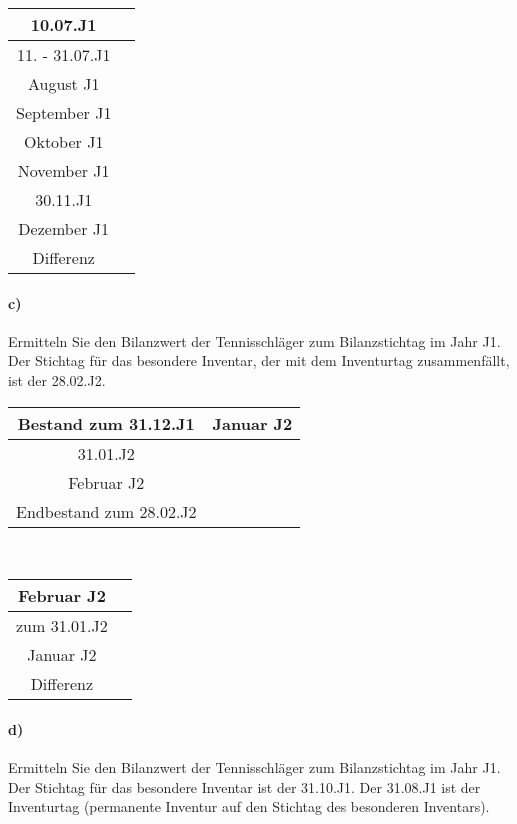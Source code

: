 \documentclass[paper=a4, fontsize=11pt]{scrartcl}
\numberwithin{equation}{section}
\numberwithin{figure}{section}
\numberwithin{table}{section}
\begin{document}
\begin{tabular}{c|c}
\hline
10.07.J1 & \\
\hline
11. - 31.07.J1 & \\
\hline
August J1 & \\
\hline
September J1 & \\
\hline
Oktober J1 & \\
\hline
November J1 & \\
\hline
30.11.J1 & \\
\hline
Dezember J1 & \\
\hline
Differenz & \\
\hline
\end{tabular}

\paragraph{c)}

Ermitteln Sie den Bilanzwert der Tennisschläger zum Bilanzstichtag im Jahr J1. Der Stichtag für das besondere Inventar, der mit dem Inventurtag zusammenfällt, ist der 28.02.J2. \\

\begin{tabular}{c|c}
\hline
Bestand zum 31.12.J1 & 
\hline
Januar J2 & \\
\hline
31.01.J2 & \\
\hline
Februar J2 & \\
\hline
Endbestand zum 28.02.J2 & \\
\hline
\end{tabular}
\\

\begin{tabular}{c|c}
\hline
Februar J2 & \\
\hline
zum 31.01.J2 & \\
\hline
Januar J2 & \\
\hline 
Differenz & \\
\hline
\end{tabular}

\paragraph{d)}

Ermitteln Sie den Bilanzwert der Tennisschläger zum Bilanzstichtag im Jahr J1. Der Stichtag für das besondere Inventar ist der 31.10.J1. Der 31.08.J1 ist der Inventurtag (permanente Inventur auf den Stichtag des besonderen Inventars).  \\
\end{document}
